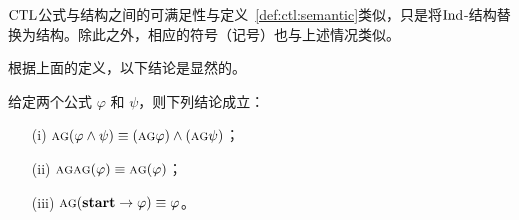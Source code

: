 $\textrm{CTL}$公式与结构之间的可满足性与定义~\ref{def:ctl:semantic}类似，只是将$\textrm{Ind}$-结构替换为结构。除此之外，相应的符号（记号）也与上述情况类似。

根据上面的定义，以下结论是显然的。
\begin{lemma} \label{lem:equivAG}
	给定两个公式 $\varphi$ 和 $\psi$，则下列结论成立：
	\begin{itemize}
		\item[(i)] $\textsc{a}\textsc{g} (\varphi\land\psi)\equiv (\textsc{a}\textsc{g} \varphi) \land (\textsc{a}\textsc{g}\psi)$；
		\item[(ii)] $\textsc{a}\textsc{g} \textsc{a}\textsc{g} (\varphi)\equiv \textsc{a}\textsc{g} (\varphi)$；
		\item[(iii)] $\textsc{a}\textsc{g} (\textbf{start} \rightarrow\varphi)\equiv \varphi$。
	\end{itemize}
\end{lemma}
